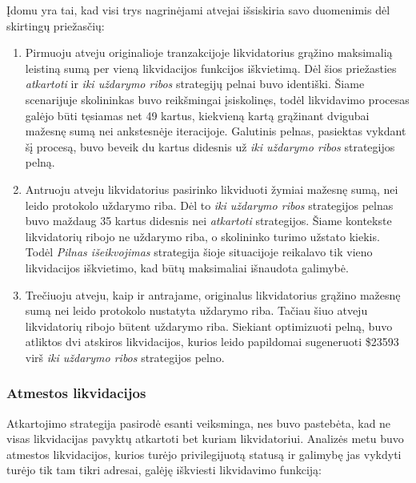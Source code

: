 \documentclass[]{VUMIFTemplateClass}
\begin{document}
Įdomu yra tai, kad visi trys nagrinėjami atvejai išsiskiria savo duomenimis dėl skirtingų priežasčių:

\begin{enumerate}[label=\textbf{\Alph*.}]
  \item Pirmuoju atveju originalioje tranzakcijoje likvidatorius grąžino maksimalią leistiną sumą per vieną likvidacijos funkcijos iškvietimą. Dėl šios priežasties \textit{atkartoti} ir \textit{iki uždarymo ribos} strategijų pelnai buvo identiški. Šiame scenarijuje skolininkas buvo reikšmingai įsiskolinęs, todėl likvidavimo procesas galėjo būti tęsiamas net 49 kartus, kiekvieną kartą grąžinant dvigubai mažesnę sumą nei ankstesnėje iteracijoje. Galutinis pelnas, pasiektas vykdant šį procesą, buvo beveik du kartus didesnis už \textit{iki uždarymo ribos} strategijos pelną.

  \item Antruoju atveju likvidatorius pasirinko likviduoti žymiai mažesnę sumą, nei leido protokolo uždarymo riba. Dėl to \textit{iki uždarymo ribos} strategijos pelnas buvo maždaug 35 kartus didesnis nei \textit{atkartoti} strategijos. Šiame kontekste likvidatorių ribojo ne uždarymo riba, o skolininko turimo užstato kiekis. Todėl \textit{Pilnas išeikvojimas} strategija šioje situacijoje reikalavo tik vieno likvidacijos iškvietimo, kad būtų maksimaliai išnaudota galimybė.

  \item Trečiuoju atveju, kaip ir antrajame, originalus likvidatorius grąžino mažesnę sumą nei leido protokolo nustatyta uždarymo riba. Tačiau šiuo atveju likvidatorių ribojo būtent uždarymo riba. Siekiant optimizuoti pelną, buvo atliktos dvi atskiros likvidacijos, kurios leido papildomai sugeneruoti \$23593 virš \textit{iki uždarymo ribos} strategijos pelno.
\end{enumerate}

\subsubsection{Atmestos likvidacijos}

Atkartojimo strategija pasirodė esanti veiksminga, nes buvo pastebėta, kad ne visas likvidacijas pavyktų atkartoti bet kuriam likvidatoriui. Analizės metu buvo atmestos likvidacijos, kurios turėjo privilegijuotą statusą ir galimybę jas vykdyti turėjo tik tam tikri adresai, galėję iškviesti likvidavimo funkciją:
\end{document}
